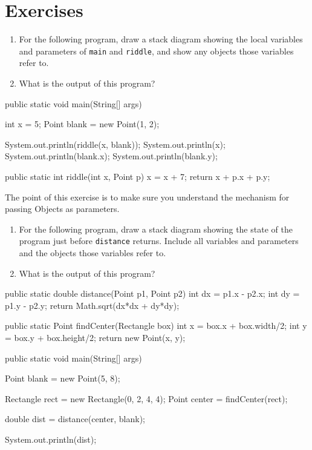 \section{Exercises}

\begin{exercise}
\begin{enumerate}

\item For the following program, draw a stack diagram showing the
local variables and parameters of {\tt main} and {\tt riddle}, and show
any objects those variables refer to.

\item What is the output of this program?

\end{enumerate}

\begin{code}
public static void main(String[] args)
{
    int x = 5;
    Point blank = new Point(1, 2);

    System.out.println(riddle(x, blank));
    System.out.println(x);
    System.out.println(blank.x);
    System.out.println(blank.y);
}

public static int riddle(int x, Point p)
{
    x = x + 7;
    return x + p.x + p.y;
}
\end{code}

The point of this exercise is to make sure you understand the
mechanism for passing Objects as parameters.
\end{exercise}


\begin{exercise}
\begin{enumerate}

\item For the following program, draw a stack diagram showing the
state of the program just before {\tt distance} returns.  Include all
variables and parameters and the objects those variables refer to.

\item What is the output of this program?

\end{enumerate}

\begin{code}
public static double distance(Point p1, Point p2) {
    int dx = p1.x - p2.x;
    int dy = p1.y - p2.y;
    return Math.sqrt(dx*dx + dy*dy);
}

public static Point findCenter(Rectangle box) {
    int x = box.x + box.width/2;
    int y = box.y + box.height/2;
    return new Point(x, y);
}

public static void main(String[] args) {
    Point blank = new Point(5, 8);

    Rectangle rect = new Rectangle(0, 2, 4, 4);
    Point center = findCenter(rect);

    double dist = distance(center, blank);

    System.out.println(dist);
}
\end{code}

\end{exercise}



